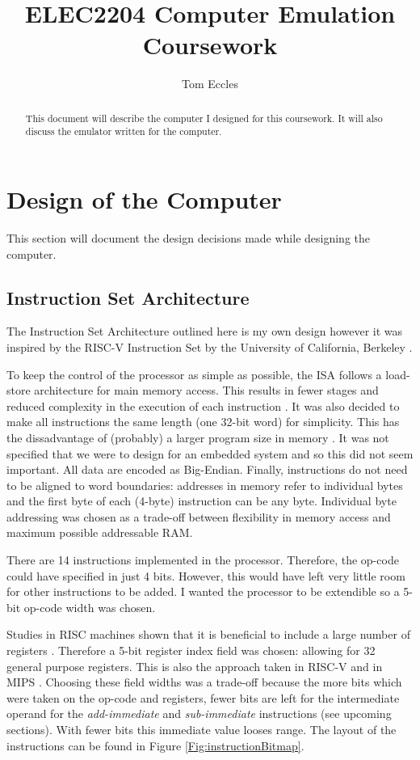 \documentclass[11pt,a4paper]{IEEEtran}
\author{Tom Eccles}
\title{ELEC2204 Computer Emulation Coursework}
\begin{document}
	\maketitle
	\begin{abstract}
		This document will describe the computer I designed for this coursework. It will also discuss the emulator written for the computer.
	\end{abstract}
	
	\section{Design of the Computer}
	This section will document the design decisions made while designing the computer.
	
			\subsection{Instruction Set Architecture}
			The Instruction Set Architecture outlined here is my own design however it was inspired by the RISC-V Instruction Set by the University of California, Berkeley \cite{riscv}.
			
			To keep the control of the processor as simple as possible, the ISA follows a load-store architecture for main memory access. This results in fewer stages and reduced complexity in the execution of each instruction \cite{bigBook}. It was also decided to make all instructions the same length (one 32-bit word) for simplicity. This has the dissadvantage of (probably) a larger program size in memory \cite{bigBook}. It was not specified that we were to design for an embedded system and so this did not seem important. All data are encoded as Big-Endian. Finally, instructions do not need to be aligned to word boundaries: addresses in memory refer to individual bytes and the first byte of each (4-byte) instruction can be any byte. Individual byte addressing was chosen as a trade-off between flexibility in memory access and maximum possible addressable RAM. 
			
			There are 14 instructions implemented in the processor. Therefore, the op-code could have specified in just 4 bits. However, this would have left very little room for other instructions to be added. I wanted the processor to be extendible so a 5-bit op-code width was chosen. 
			
			Studies in RISC machines shown that it is beneficial to include a large number of registers \cite{smallerBook}. Therefore a 5-bit register index field was chosen: allowing for 32 general purpose registers. This is also the approach taken in RISC-V \cite{riscv} and in MIPS \cite{bigBook}. Choosing these field widths was a trade-off because the more bits which were taken on the op-code and registers, fewer bits are left for the intermediate operand for the \textit{add-immediate} and \textit{sub-immediate} instructions (see upcoming sections). With fewer bits this immediate value looses range. The layout of the instructions can be found in Figure \ref{Fig:instructionBitmap}.
			
\end{document}

